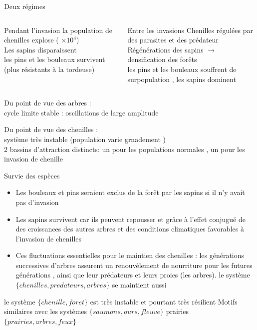 \documentclass[11,aspectratio=1610]{beamer}
\begin{document}
\begin{frame}{Deux régimes}


\begin{small}
\begin{columns}
  \begin{block}{\alert{Pendant l'invasion}} 
  la population de chenilles explose ( $\times 10^4$) \\
  Les sapins disparaissent\\ 
  les pins et les bouleaux survivent (plus résistants à la tordeuse)
  \end{block}
  \begin{block}{\alert{Entre les invasions}}
  Chenilles régulées par des parasites et des prédateur\\
  Régénérations des sapins  $\rightarrow$ densification des forêts\\
  les pins et les bouleaux souffrent de surpopulation , les sapins dominent  
  
  \end{block}
\end{columns}
\end{small}

\vfill

Du point de vue des arbres   :\\
 \alert{cycle limite stable}  : oscillations de large amplitude

Du point de vue des chenilles : \\
  système très instable (population varie grnadement )\\
 \alert{2 bassins d'attraction distincts}: un pour les populations normales , un pour les invasion de chenille 




\end{frame}
\begin{frame}{Survie des espèces}


\begin{itemize} 
\item Les bouleaux et pins seraient exclus de la forêt par les sapins si il n'y avait pas d'invasion
\item Les sapins survivent car ils peuvent repousser et grâce à l'effet conjugué de des croissances des autres arbres et des conditions climatiques favorables à l'invasion de chenilles
\item Ces fluctuations essentielles pour le maintien des chenilles  : les générations successives d'arbres assurent un renouvèlement de nourriture pour les futures générations , ainsi que leur prédateurs et leurs proies (les arbres). le système  $\{chenilles, predateurs, arbres\}$ se maintient aussi
\end{itemize}
\vfill
le système $\{chenille, foret\}$ est très \alert{instable} et pourtant très \alert{résilient}
\vfill
Motifs similaires avec les systèmes  $\{saumons,ours,fleuve\}$ prairies $\{prairies, arbres, feux \}$ 

\end{frame}
\end{document}
